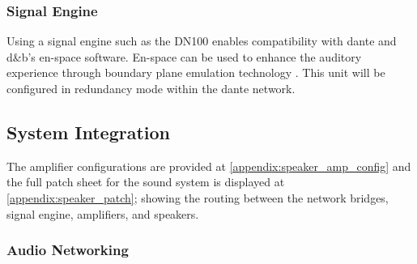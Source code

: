         \subsubsection{Signal Engine}
            Using a signal engine such as the DN100 enables compatibility with dante and d\&b's en-space software. En-space can be used to enhance the auditory experience through boundary plane emulation technology \citep{ds100}. This unit will be configured in redundancy mode within the dante network.

    \subsection{System Integration}

        The amplifier configurations are provided at \ref{appendix:speaker_amp_config} and the full patch sheet for the sound system is displayed at \ref{appendix:speaker_patch}; showing the routing between the network bridges, signal engine, amplifiers, and speakers.

        \subsubsection{Audio Networking}
        